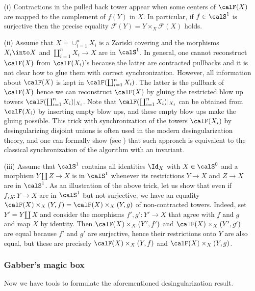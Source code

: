 \documentclass[10pt]{../fichiers-configuration-latex/smfart}
\begin{document}
\begin{remark2}\label{8-functorrem} (i) Contractions in the pulled
back tower appear when some centers of $\calF(X)$ are mapped to
the complement of $f(Y)$ in $X$. In particular, if $f\in\calS^1$
is surjective then the precise equality $\mathscr{F}(Y) = Y \times_X
\mathscr{F}(X)$ holds.

(ii) Assume that $X=\cup_{i=1}^nX_i$ is a Zariski covering and
the morphisms $X_i\into X$ and $\coprod_{i=1}^nX_i\to X$ are
in $\calS^1$. In general, one cannot reconstruct $\calF(X)$
from $\calF(X_i)$'s because the latter are contracted
pullbacks and it is not clear how to glue them with correct
synchronization. However, all information about $\calF(X)$ is
kept in $\calF(\coprod_{i=1}^nX_i)$. The latter is the pullback
of $\calF(X)$ hence we can reconstruct $\calF(X)$ by gluing the
restricted blow up towers $\calF(\coprod_{i=1}^nX_i)|_{X_i}$. Note
that $\calF(\coprod_{i=1}^nX_i)|_{X_i}$ can be obtained from
$\calF(X_i)$ by inserting empty blow ups, and these empty blow ups
make the gluing possible. This trick with synchronization of the
towers $\calF(X_i)$ by desingularizing disjoint unions is often
used in the modern desingularization theory, and one can formally
show (see \cite[Rem. 2.3.4(iv)]{Temkin@qe}) that such approach is
equivalent to the classical synchronization of the algorithm with
an invariant.

(iii) Assume that $\calS^1$ contains all identities $\Id_X$
with $X\in\calS^0$ and a morphism $Y\coprod Z\to X$ is in
$\calS^1$ whenever its restrictions $Y\to X$ and $Z\to X$ are in
$\calS^1$. As an illustration of the above trick, let us show that
even if $f,g{\colon}Y\to X$ are in $\calS^1$ but not surjective,
we have an equality $\calF(X)\times_X(Y,f)=\calF(X)\times_X(Y,g)$
of non-contracted towers. Indeed, set $Y'=Y\coprod X$ and consider
the morphisms $f',g'{\colon}Y'\to X$ that agree with $f$ and
$g$ and map $X$ by identity. Then $\calF(X)\times_X(Y',f')$
and $\calF(X)\times_X(Y',g')$ are equal because $f'$ and $g'$
are surjective, hence their restrictions onto $Y$ are also
equal, but these are precisely $\calF(X)\times_X(Y,f)$ and
$\calF(X)\times_X(Y,g)$.  \end{remark2}

\subsubsection{Gabber's magic box}\label{8-magicboxsec} Now we have
tools to formulate the aforementioned desingularization result.
\end{document}
